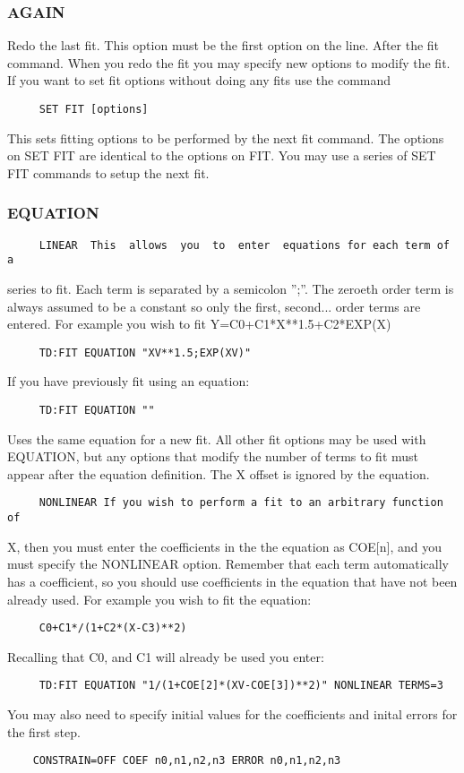 \subsubsection{AGAIN       }
Redo  the  last fit.  This option must be the first option on the line.
After the fit command.  When you redo  the  fit  you  may  specify  new
options  to  modify  the  fit.   If you want to set fit options without
doing any fits use the command 
\begin{verbatim}
     SET FIT [options] 
\end{verbatim}
This sets fitting options to be performed by the next fit command.  The
options on SET FIT are identical to the options on FIT.  You may use  a
series of SET FIT commands to setup the next fit.  
\subsubsection{EQUATION    }
\begin{verbatim}
     LINEAR  This  allows  you  to  enter  equations for each term of a
\end{verbatim}
series to fit.  Each term is separated by a semicolon '';''.  The zeroeth
order  term  is  always  assumed  to  be  a constant so only the first,
second...  order terms are  entered.   For  example  you  wish  to  fit
Y=C0+C1*X**1.5+C2*EXP(X) 
\begin{verbatim}
     TD:FIT EQUATION "XV**1.5;EXP(XV)" 
\end{verbatim}

If you have previously fit using an equation:  
\begin{verbatim}
     TD:FIT EQUATION "" 
\end{verbatim}
Uses  the  same  equation  for a new fit.  All other fit options may be
used with EQUATION, but any options that modify the number of terms  to
fit must appear after the equation definition.  The X offset is ignored
by the equation.  

\begin{verbatim}
     NONLINEAR If you wish to perform a fit to an arbitrary function of
\end{verbatim}
X, then you must enter the coefficients in the the equation as  COE[n],
and  you  must  specify  the NONLINEAR option.  Remember that each term
automatically has a coefficient, so you should use coefficients in  the
equation  that have not been already used.  For example you wish to fit
the equation:  
\begin{verbatim}
     C0+C1*/(1+C2*(X-C3)**2) 
\end{verbatim}
Recalling that C0, and C1 will already be used you enter:  
\begin{verbatim}
     TD:FIT EQUATION "1/(1+COE[2]*(XV-COE[3])**2)" NONLINEAR TERMS=3 
\end{verbatim}
You  may  also  need to specify initial values for the coefficients and
inital errors for the first step.  
\begin{verbatim}
    CONSTRAIN=OFF COEF n0,n1,n2,n3 ERROR n0,n1,n2,n3 
\end{verbatim}

